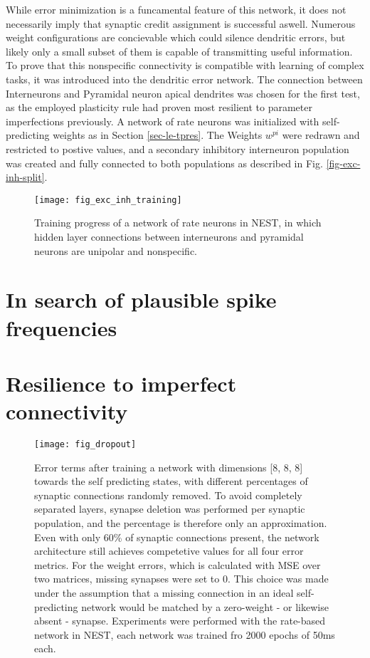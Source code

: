 While error minimization is a funcamental feature of this network, it does not necessarily imply that synaptic credit
assignment is successful aswell. Numerous weight configurations are concievable which could silence dendritic errors,
but likely only a small subset of them is capable of transmitting useful information. To prove that this nonspecific
connectivity is compatible with learning of complex tasks, it was introduced into the dendritic error network. The
connection between Interneurons and Pyramidal neuron apical dendrites was chosen for the first test, as the employed
plasticity rule had proven most resilient to parameter imperfections previously. A network of rate neurons was
initialized with self-predicting weights as in Section \ref{sec-le-tpres}. The Weights $w^{pi}$ were redrawn and
restricted to postive values, and a secondary inhibitory interneuron population was created and fully connected to both
populations as described in Fig. \ref{fig-exc-inh-split}.


\begin{figure}[t]
    \centering
    \texttt{[image: fig\_exc\_inh\_training]}
    \caption{Training progress of a network of rate neurons in NEST, in which hidden layer connections between
        interneurons and pyramidal neurons are unipolar and nonspecific.}
    \label{fig-exc-inh-training}
\end{figure}


\section{In search of plausible spike frequencies}


\section{Resilience to imperfect connectivity}

\begin{figure}[t]
    \centering
    \texttt{[image: fig\_dropout]}
    \caption{Error terms after training a network with dimensions [8, 8, 8] towards the self predicting states, with
        different percentages of synaptic connections randomly removed. To avoid completely separated layers, synapse
        deletion was performed per synaptic population, and the percentage is therefore only an approximation. Even with
        only 60\% of synaptic connections present, the network architecture still achieves competetive values for all four
        error metrics. For the weight errors, which is calculated with MSE over two matrices, missing
        synapses were set to $0$. This choice was made under the assumption that a missing connection in an ideal
        self-predicting network would be matched by a zero-weight - or likewise absent - synapse. Experiments were performed
        with the rate-based network in NEST, each network was trained fro 2000 epochs of 50ms each.}
    \label{fig-dropout}
\end{figure}


